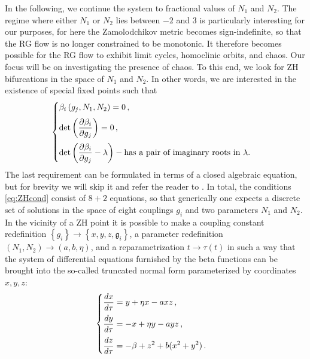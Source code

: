In the following, we continue the system to fractional values of $N_1$ and $N_2$. The regime where  either $N_1$ or $N_2$ lies between $-2$ and $3$ is particularly interesting for our purposes, for here the Zamolodchikov metric becomes sign-indefinite, so that the RG flow is no longer constrained to be monotonic. It therefore becomes possible for the RG flow to exhibit limit cycles, homoclinic orbits, and chaos. Our focus will be on investigating the presence of chaos. To this end, we look for ZH bifurcations \cite{takens1974singularities,guckenheimer2013nonlinear,Kuznetsov2004} in the space of $N_1$ and $N_2$. In other words, we are interested in the existence of special fixed points such that
\begin{gather}
\begin{cases}
    \displaystyle    \beta_i\left(g_j,N_1,N_2\right) = 0\,,
    \vspace{2mm}
    \\
    \displaystyle
    \det\left(\frac{\partial \beta_i}{\partial g_j}\right) = 0\,, 
    \vspace{2mm}
    \\
    \displaystyle
    \det\left(\frac{\partial \beta_i}{\partial g_j}-\lambda\right) - \text{has a pair of imaginary roots in $\lambda$}. 
    \end{cases}
    \label{eq:ZHcond}
\end{gather}
The last requirement can be formulated in terms of a closed algebraic equation, but for brevity we will skip it and refer the reader to \cite{Jepsen2021HomoclinicRG}. In total, the conditions \cref{eq:ZHcond} consist of $8+2$ equations, so that generically one expects a discrete set of solutions in the space of eight couplings $g_i$ and two parameters $N_1$ and $N_2$. 
In the vicinity of a ZH point it is possible to make a coupling constant redefinition $\left\{g_i\right\} \to \left\{x,y,z,\mathfrak{g}_i\right\}$, a parameter redefinition $(N_1,N_2) \to (a,b,\eta)$, and a reparametrization $t\rightarrow \tau(t)$ in such a way that the system of differential equations furnished by the beta functions can be brought into the so-called truncated normal form 
parameterized by coordinates $x,y,z$:
\begin{gather}
\begin{cases}
\displaystyle    \frac{dx}{d\tau} = y +\eta x- axz\,, 
\vspace{2mm}
\\
\displaystyle       \frac{dy}{d\tau} = -x+\eta y-ayz\,,
     \label{eq:ZHnormform}
     \vspace{2mm}
    \\
\displaystyle   
    \frac{dz}{d\tau} = -\beta+z^2+b(x^2+y^2)\,.
\end{cases}
\end{gather}
